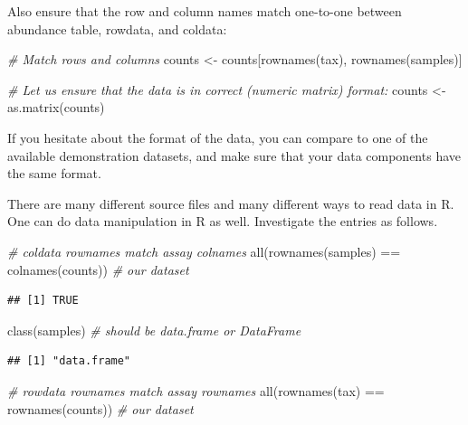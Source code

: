 \documentclass[
]{book}
\newenvironment{Shaded}{\begin{snugshade}}{\end{snugshade}}
\newcommand{\CommentTok}[1]{\textcolor[rgb]{0.56,0.35,0.01}{\textit{#1}}}
\newcommand{\FunctionTok}[1]{\textcolor[rgb]{0.00,0.00,0.00}{#1}}
\newcommand{\NormalTok}[1]{#1}
\newcommand{\OtherTok}[1]{\textcolor[rgb]{0.56,0.35,0.01}{#1}}
\newcommand{\SpecialCharTok}[1]{\textcolor[rgb]{0.00,0.00,0.00}{#1}}
\begin{document}
Also ensure that the row and column names match one-to-one between
abundance table, rowdata, and coldata:

\begin{Shaded}
\begin{Highlighting}[]
\CommentTok{\# Match rows and columns}
\NormalTok{counts }\OtherTok{\textless{}{-}}\NormalTok{ counts[}\FunctionTok{rownames}\NormalTok{(tax), }\FunctionTok{rownames}\NormalTok{(samples)]}

\CommentTok{\# Let us ensure that the data is in correct (numeric matrix) format:}
\NormalTok{counts }\OtherTok{\textless{}{-}} \FunctionTok{as.matrix}\NormalTok{(counts)}
\end{Highlighting}
\end{Shaded}

If you hesitate about the format of the data, you can compare to one
of the available demonstration datasets, and make sure that your data
components have the same format.

There are many different source files and many different ways to read
data in R. One can do data manipulation in R as well. Investigate the
entries as follows.

\begin{Shaded}
\begin{Highlighting}[]
\CommentTok{\# coldata rownames match assay colnames}
\FunctionTok{all}\NormalTok{(}\FunctionTok{rownames}\NormalTok{(samples) }\SpecialCharTok{==} \FunctionTok{colnames}\NormalTok{(counts)) }\CommentTok{\# our dataset}
\end{Highlighting}
\end{Shaded}

\begin{verbatim}
## [1] TRUE
\end{verbatim}

\begin{Shaded}
\begin{Highlighting}[]
\FunctionTok{class}\NormalTok{(samples) }\CommentTok{\# should be data.frame or DataFrame}
\end{Highlighting}
\end{Shaded}

\begin{verbatim}
## [1] "data.frame"
\end{verbatim}

\begin{Shaded}
\begin{Highlighting}[]
\CommentTok{\# rowdata rownames match assay rownames}
\FunctionTok{all}\NormalTok{(}\FunctionTok{rownames}\NormalTok{(tax) }\SpecialCharTok{==} \FunctionTok{rownames}\NormalTok{(counts)) }\CommentTok{\# our dataset}
\end{Highlighting}
\end{Shaded}
\end{document}
